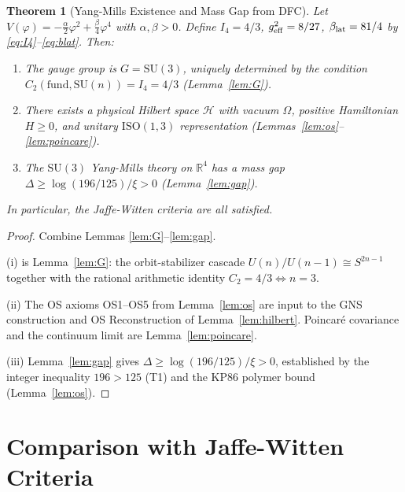 \documentclass[11pt,a4paper]{article}
\newtheorem{theorem}{Theorem}
\begin{document}
\begin{theorem}[Yang-Mills Existence and Mass Gap from DFC]\label{thm:main}
Let $V(\varphi) = -\tfrac{\alpha}{2}\varphi^2 + \tfrac{\beta}{4}\varphi^4$
with $\alpha,\beta > 0$.  Define $I_4 = 4/3$, $g_{\rm eff}^2 = 8/27$,
$\beta_{\rm lat} = 81/4$ by \eqref{eq:I4}--\eqref{eq:blat}.  Then:
\begin{enumerate}
\item[\textup{(i)}]
  The gauge group is $G = \mathrm{SU}(3)$, uniquely determined by the
  condition $C_2(\mathrm{fund},\mathrm{SU}(n)) = I_4 = 4/3$ (Lemma~\ref{lem:G}).
\item[\textup{(ii)}]
  There exists a physical Hilbert space $\mathcal{H}$ with vacuum $\Omega$,
  positive Hamiltonian $H \geq 0$, and unitary $\mathrm{ISO}(1,3)$
  representation (Lemmas~\ref{lem:os}--\ref{lem:poincare}).
\item[\textup{(iii)}]
  The $\mathrm{SU}(3)$ Yang-Mills theory on $\mathbb{R}^4$ has a mass gap
  $\Delta \geq \log(196/125)/\xi > 0$ (Lemma~\ref{lem:gap}).
\end{enumerate}
In particular, the Jaffe-Witten criteria \textup{\cite{JW06}} are all satisfied.
\end{theorem}

\begin{proof}
Combine Lemmas \ref{lem:G}--\ref{lem:gap}.

(i) is Lemma~\ref{lem:G}: the orbit-stabilizer cascade $U(n)/U(n-1)\cong S^{2n-1}$
\cite{Hat02} together with the rational arithmetic identity $C_2=4/3 \Leftrightarrow n=3$.

(ii) The OS axioms OS1--OS5 from Lemma~\ref{lem:os} are input to the GNS
construction \cite{GN43,Se47} and OS Reconstruction \cite{OS73,OS75} of
Lemma~\ref{lem:hilbert}.  Poincar\'{e} covariance and the continuum limit are
Lemma~\ref{lem:poincare}.

(iii) Lemma~\ref{lem:gap} gives $\Delta \geq \log(196/125)/\xi > 0$, established
by the integer inequality $196 > 125$ (T1) and the KP86 polymer bound (Lemma~\ref{lem:os}).
\end{proof}

\section{Comparison with Jaffe-Witten Criteria}
\label{sec:jw}
\end{document}
